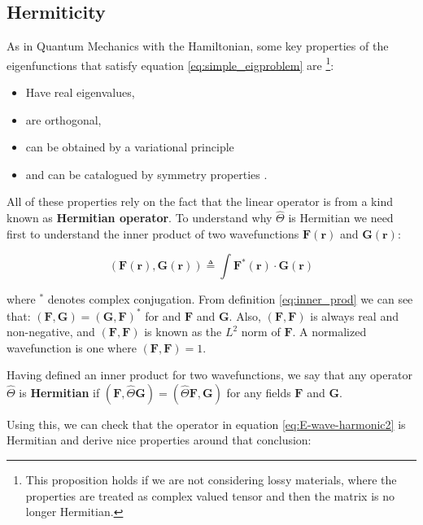 \subsection{Hermiticity}
As in Quantum Mechanics with the Hamiltonian, some key properties of the eigenfunctions that satisfy equation \ref{eq:simple_eigproblem} are \footnote{This proposition holds if we are not considering lossy materials, where the properties are treated as complex valued tensor and then the matrix is no longer Hermitian.}:
\begin{itemize}
\item Have real eigenvalues,
\item are orthogonal,
\item can be obtained by a variational principle
\item and can be catalogued by symmetry properties .
\end{itemize}

All of these properties rely on the fact that the linear operator is from a kind known as \textbf{Hermitian operator}. To understand why $\hat{\Theta}$ is Hermitian we need first to understand the inner product of two wavefunctions $\mathbf{F(r)}$ and $\mathbf{G(r)}$:

\begin{equation}
\left( \mathbf{F(r)},\mathbf{G(r)}\right)  \triangleq
\int \mathbf{F^*(r)}\cdot \mathbf{G(r)}
\label{eq:inner_prod}
\end{equation}

where $^*$ denotes complex conjugation. From definition \ref{eq:inner_prod} we can see that:
$\left(\mathbf{F},\mathbf{G}\right) =  \left(\mathbf{G},\mathbf{F}\right)^*$
 for and $\mathbf{F}$ and $\mathbf{G}$. Also, $\left(\mathbf{F},\mathbf{F}\right)$ is always real and non-negative, and $\left(\mathbf{F},\mathbf{F}\right)$ is known as the $L^2$ norm of $\mathbf{F}$. A normalized wavefunction is one where 
 $\left(\mathbf{F},\mathbf{F}\right)=1$.

Having defined an inner product for two wavefunctions, we say that any operator $\hat{\Theta}$ is \textbf{Hermitian} if $\left(\mathbf{F},\hat{\Theta}\mathbf{G}\right) = \left(\hat{\Theta}\mathbf{F},\mathbf{G}\right)$
for any fields $\mathbf{F}$ and $\mathbf{G}$. 

Using this, we can check that the operator in equation \ref{eq:E-wave-harmonic2} is Hermitian and derive nice properties around that conclusion:

